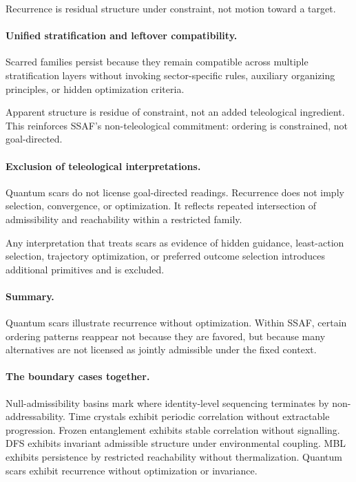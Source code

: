 \documentclass[aps,prx,onecolumn,11pt]{revtex4-2}
\theoremstyle{plain}
\theoremstyle{definition}
\theoremstyle{remark}
\begin{document}
Recurrence is residual structure under constraint, not motion toward a
target.

\paragraph{Unified stratification and leftover compatibility.}

Scarred families persist because they remain compatible across multiple
stratification layers without invoking sector-specific rules,
auxiliary organizing principles, or hidden optimization criteria.

Apparent structure is residue of constraint, not an added teleological
ingredient. This reinforces SSAF's non-teleological commitment:
ordering is constrained, not goal-directed.

\paragraph{Exclusion of teleological interpretations.}

Quantum scars do not license goal-directed readings. Recurrence does
not imply selection, convergence, or optimization. It reflects repeated
intersection of admissibility and reachability within a restricted
family.

Any interpretation that treats scars as evidence of hidden guidance,
least-action selection, trajectory optimization, or preferred outcome
selection introduces additional primitives and is excluded.

\paragraph{Summary.}

Quantum scars illustrate recurrence without optimization. Within SSAF,
certain ordering patterns reappear not because they are favored, but
because many alternatives are not licensed as jointly admissible under
the fixed context.

\paragraph{The boundary cases together.}

Null-admissibility basins mark where identity-level sequencing
terminates by non-addressability. Time crystals exhibit periodic
correlation without extractable progression. Frozen entanglement
exhibits stable correlation without signalling. DFS exhibits invariant
admissible structure under environmental coupling. MBL exhibits
persistence by restricted reachability without thermalization. Quantum
scars exhibit recurrence without optimization or invariance.
\end{document}
